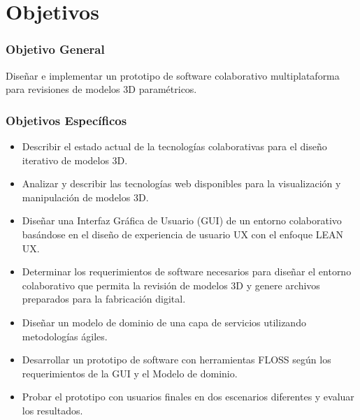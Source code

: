 \clearpage
\section{Objetivos}
\subsubsection {Objetivo General}
Diseñar e implementar un prototipo de software colaborativo multiplataforma para revisiones de modelos 3D paramétricos.

\subsubsection {Objetivos Específicos}
\begin{itemize}
  \item Describir el estado actual de la tecnologías colaborativas para el diseño iterativo de modelos 3D.
  \item Analizar y describir las tecnologías web disponibles para la visualización y manipulación de modelos 3D.
  \item Diseñar una Interfaz Gráfica de Usuario (GUI) de un entorno colaborativo basándose en el diseño de experiencia de usuario UX con el enfoque LEAN UX.
  \item Determinar los requerimientos de software necesarios para diseñar el entorno colaborativo que permita la revisión de modelos 3D y genere archivos preparados para la fabricación digital.
  \item Diseñar un modelo de dominio de una capa de servicios utilizando metodologías ágiles.
  \item Desarrollar un prototipo de software con herramientas FLOSS según los requerimientos de la GUI y el Modelo de dominio.
  \item Probar el prototipo con usuarios finales en dos escenarios diferentes y evaluar los resultados.
\end{itemize}





